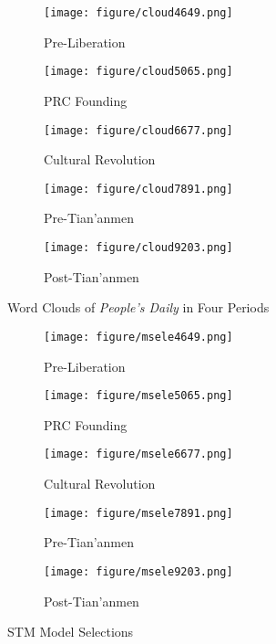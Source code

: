 \documentclass[abstracton,UTF8]{ctexart}
\begin{document}
\begin{figure}[ht]
	\begin{subfigure}{0.33\textwidth}
		\texttt{[image: figure/cloud4649.png]}
		\caption{Pre-Liberation}
		\label{f:cloud46}
	\end{subfigure}
	\begin{subfigure}{0.33\textwidth}
		\texttt{[image: figure/cloud5065.png]}
		\caption{PRC Founding}
		\label{f:cloud50}
	\end{subfigure}
	\begin{subfigure}{0.33\textwidth}
		\texttt{[image: figure/cloud6677.png]}
		\caption{Cultural Revolution}
		\label{f:cloud66}
	\end{subfigure}
	\begin{subfigure}{0.33\textwidth}
		\texttt{[image: figure/cloud7891.png]}
		\caption{Pre-Tian'anmen}
		\label{f:cloud78}
	\end{subfigure}
	\begin{subfigure}{0.33\textwidth}
		\texttt{[image: figure/cloud9203.png]}
		\caption{Post-Tian'anmen}
		\label{f:cloud92}
	\end{subfigure}
	\caption{Word Clouds of \textit{People's Daily} in Four Periods}
	\label{f:cloudrmrb}
\end{figure}


\begin{figure}[ht]
	\begin{subfigure}{0.45\textwidth}
		\texttt{[image: figure/msele4649.png]}
		\caption{Pre-Liberation}
		\label{f:msele46}
	\end{subfigure}
	\begin{subfigure}{0.45\textwidth}
		\texttt{[image: figure/msele5065.png]}
		\caption{PRC Founding}
		\label{f:msele50}
	\end{subfigure}
	\begin{subfigure}{0.45\textwidth}
		\texttt{[image: figure/msele6677.png]}
		\caption{Cultural Revolution}
		\label{f:msele66}
	\end{subfigure}
	\begin{subfigure}{0.45\textwidth}
		\texttt{[image: figure/msele7891.png]}
		\caption{Pre-Tian'anmen}
		\label{f:msele78}
	\end{subfigure}
	\begin{subfigure}{0.45\textwidth}
		\texttt{[image: figure/msele9203.png]}
		\caption{Post-Tian'anmen}
		\label{f:msele92}
	\end{subfigure}
	\caption{STM Model Selections}
	\label{f:mselermrb}
\end{figure}
\end{document}

